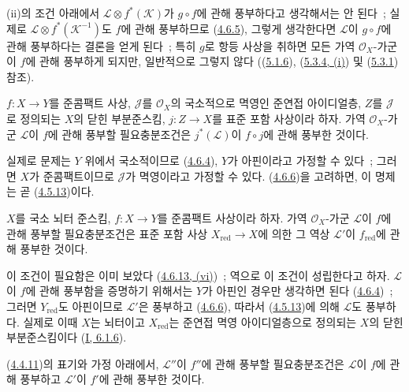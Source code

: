 \begin{remark}[4.6.14]
\label{II.4.6.14-ko}
(ii)의 조건 아래에서
$\mathcal{L}\otimes f^*(\mathcal{K})$가 $g\circ f$에 관해 풍부하다고
생각해서는 안 된다~; 실제로
$\mathcal{L}\otimes f^*(\mathcal{K}^{-1})$도 $f$에 관해 풍부하므로
(\hyperref[II.4.6.5-ko]{4.6.5}), 그렇게 생각한다면
$\mathcal{L}$이 $g\circ f$에 관해 풍부하다는 결론을 얻게 된다~;
특히 $g$로 항등 사상을 취하면 모든 가역 $\mathcal{O}_X$-가군이
$f$에 관해 풍부하게 되지만, 일반적으로 그렇지 않다
((\hyperref[II.5.1.6-ko]{5.1.6}),
(\hyperref[II.5.3.4-ko]{5.3.4, (i)}) 및
(\hyperref[II.5.3.1-ko]{5.3.1}) 참조).
\end{remark}

\begin{proposition}[4.6.15]
\label{II.4.6.15-ko}
$f:X\to Y$를 준콤팩트 사상, $\mathcal{J}$를 $\mathcal{O}_X$의
국소적으로 멱영인 준연접 아이디얼층, $Z$를 $\mathcal{J}$로 정의되는
$X$의 닫힌 부분준스킴, $j:Z\to X$를 표준 포함 사상이라 하자. 가역
$\mathcal{O}_X$-가군 $\mathcal{L}$이 $f$에 관해 풍부할 필요충분조건은
$j^*(\mathcal{L})$이 $f\circ j$에 관해 풍부한 것이다.
\end{proposition}

실제로 문제는 $Y$ 위에서 국소적이므로
(\hyperref[II.4.6.4-ko]{4.6.4}), $Y$가 아핀이라고 가정할 수 있다~;
그러면 $X$가 준콤팩트이므로 $\mathcal{J}$가 멱영이라고 가정할 수
있다. (\hyperref[II.4.6.6-ko]{4.6.6})을 고려하면, 이 명제는 곧
(\hyperref[II.4.5.13-ko]{4.5.13})이다.

\begin{corollary}[4.6.16]
\label{II.4.6.16-ko}
$X$를 국소 뇌터 준스킴, $f:X\to Y$를 준콤팩트 사상이라 하자. 가역
$\mathcal{O}_X$-가군 $\mathcal{L}$이 $f$에 관해 풍부할 필요충분조건은
표준 포함 사상 $X_{\mathrm{red}}\to X$에 의한 그 역상
$\mathcal{L}'$이 $f_{\mathrm{red}}$에 관해 풍부한 것이다.
\end{corollary}

이 조건이 필요함은 이미 보았다
(\hyperref[II.4.6.13-ko]{4.6.13, (vi)})~; 역으로 이 조건이 성립한다고
하자. $\mathcal{L}$이 $f$에 관해 풍부함을 증명하기 위해서는 $Y$가
아핀인 경우만 생각하면 된다 (\hyperref[II.4.6.4-ko]{4.6.4})~;
그러면 $Y_{\mathrm{red}}$도 아핀이므로 $\mathcal{L}'$은 풍부하고
(\hyperref[II.4.6.6-ko]{4.6.6}), 따라서
(\hyperref[II.4.5.13-ko]{4.5.13})에 의해 $\mathcal{L}$도 풍부하다.
실제로 이때 $X$는 뇌터이고 $X_{\mathrm{red}}$는 준연접 멱영
아이디얼층으로 정의되는 $X$의 닫힌 부분준스킴이다
(\hyperref[I.6.1.6-ko]{I, 6.1.6}).

\begin{proposition}[4.6.17]
\label{II.4.6.17-ko}
(\hyperref[II.4.4.11-ko]{4.4.11})의 표기와 가정 아래에서,
$\mathcal{L}''$이 $f''$에 관해 풍부할 필요충분조건은
$\mathcal{L}$이 $f$에 관해 풍부하고 $\mathcal{L}'$이 $f'$에 관해
풍부한 것이다.
\end{proposition}

